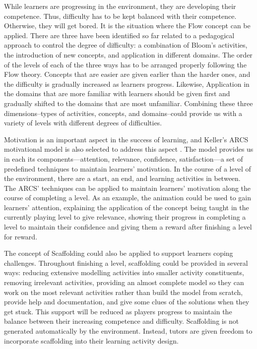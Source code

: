 \documentclass[10pt, a4paper]{report} \usepackage[titletoc]{appendix}
\begin{document}
While learners are progressing in the environment, they are developing their competence. Thus, difficulty has to be kept balanced with their competence. Otherwise, they will get bored. It is the situation where the Flow concept \cite{csikszentmihalyi2014toward} can be applied. There are three have been identified so far related to a pedagogical approach to control the degree of difficulty: a combination of Bloom's activities, the introduction of new concepts, and application in different domains. The order of the levels of each of the three ways has to be arranged properly following the Flow theory. Concepts that are easier are given earlier than the harder ones, and the difficulty is gradually increased as learners progress. Likewise, Application in the domains that are more familiar with learners should be given first and gradually shifted to the domains that are most unfamiliar. Combining these three dimensions--types of activities, concepts, and domains--could provide us with a variety of levels with different degrees of difficulties. 

Motivation is an important aspect in the success of learning, and Keller's ARCS motivational model is also selected to address this aspect \cite{keller2010motivational}. The model provides us in each its components---attention, relevance, confidence, satisfaction---a set of predefined techniques to maintain learners' motivation. In the course of a level of the environment, there are a start, an end, and learning activities in between. The ARCS' techniques can be applied to maintain learners' motivation along the course of completing a level. As an example, the animation could be used to gain learners' attention, explaining the application of the concept being taught in the currently playing level to give relevance, showing their progress in completing a level to maintain their confidence and giving them a reward after finishing a level for reward. 
 
The concept of Scaffolding \cite{vygotsky1978mind, wood1976role} could also be applied to support learners coping challenges. Throughout finishing a level, scaffolding could be provided in several ways: reducing extensive modelling activities into smaller activity constituents, removing irrelevant activities, providing an almost complete model so they can work on the most relevant activities rather than build the model from scratch, provide help and documentation, and give some clues of the solutions when they get stuck. This support will be reduced as players progress to maintain the balance between their increasing competence and difficulty. Scaffolding is not generated automatically by the environment. Instead, tutors are given freedom to incorporate scaffolding into their learning activity design. 
\end{document}
